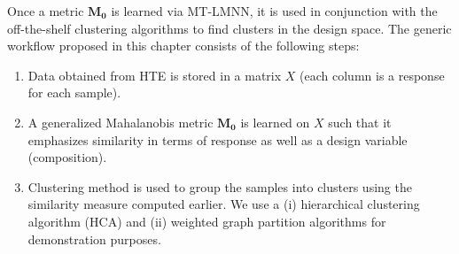 Once a metric \(\mathbf{M_0}\) is learned via MT-LMNN, it is used in conjunction with the off-the-shelf clustering algorithms to find clusters in the design space. The generic workflow proposed in this chapter consists of the following steps: 
\begin{enumerate}
\item Data obtained from HTE is stored in a matrix $X$ (each column is a response for each sample).
\item A generalized Mahalanobis metric \(\mathbf{M_0}\) is learned on $X$ such that it emphasizes similarity in terms of response as well as a design variable (composition).
\item Clustering method is used to group the samples into clusters using the similarity measure computed earlier. We use a (i) hierarchical clustering algorithm (HCA) and (ii) weighted graph partition algorithms for demonstration purposes. 
\end{enumerate}